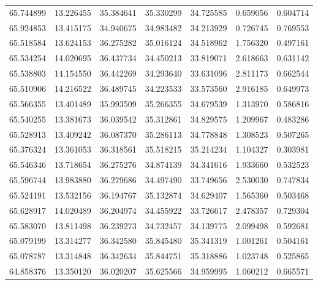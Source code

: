 \begin{tabular}{rrrrrrr}
 65.744899 &  13.226455 &         35.384641 &         35.330299 &         34.725585 &  0.659056 &  0.604714 \\
 65.924853 &  13.415175 &         34.940675 &         34.983482 &         34.213929 &  0.726745 &  0.769553 \\
 65.518584 &  13.624153 &         36.275282 &         35.016124 &         34.518962 &  1.756320 &  0.497161 \\
 65.534254 &  14.020695 &         36.437734 &         34.450213 &         33.819071 &  2.618663 &  0.631142 \\
 65.538803 &  14.154550 &         36.442269 &         34.293640 &         33.631096 &  2.811173 &  0.662544 \\
 65.510906 &  14.216522 &         36.489745 &         34.223533 &         33.573560 &  2.916185 &  0.649973 \\
 65.566355 &  13.401489 &         35.993509 &         35.266355 &         34.679539 &  1.313970 &  0.586816 \\
 65.540255 &  13.381673 &         36.039542 &         35.312861 &         34.829575 &  1.209967 &  0.483286 \\
 65.528913 &  13.409242 &         36.087370 &         35.286113 &         34.778848 &  1.308523 &  0.507265 \\
 65.376324 &  13.361053 &         36.318561 &         35.518215 &         35.214234 &  1.104327 &  0.303981 \\
 65.546346 &  13.718654 &         36.275276 &         34.874139 &         34.341616 &  1.933660 &  0.532523 \\
 65.596744 &  13.983880 &         36.279686 &         34.497490 &         33.749656 &  2.530030 &  0.747834 \\
 65.524191 &  13.532156 &         36.194767 &         35.132874 &         34.629407 &  1.565360 &  0.503468 \\
 65.628917 &  14.020489 &         36.204974 &         34.455922 &         33.726617 &  2.478357 &  0.729304 \\
 65.583070 &  13.811498 &         36.239273 &         34.732457 &         34.139775 &  2.099498 &  0.592681 \\
 65.079199 &  13.314277 &         36.342580 &         35.845480 &         35.341319 &  1.001261 &  0.504161 \\
 65.078787 &  13.314848 &         36.342634 &         35.844751 &         35.318886 &  1.023748 &  0.525865 \\
 64.858376 &  13.350120 &         36.020207 &         35.625566 &         34.959995 &  1.060212 &  0.665571 \\

\end{tabular}
